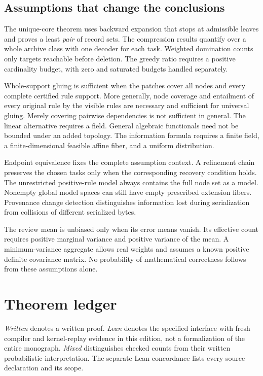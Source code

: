 \documentclass[11pt,oneside]{article}
\theoremstyle{komorebiplain}
\theoremstyle{komorebidefinition}
\theoremstyle{komorebiremark}
\begin{document}
\subsection*{Assumptions that change the conclusions}
The unique-core theorem uses backward expansion that stops at admissible leaves and proves a least \emph{pair} of record sets. The compression results quantify over a whole archive class with one decoder for each task. Weighted domination counts only targets reachable before deletion. The greedy ratio requires a positive cardinality budget, with zero and saturated budgets handled separately.

Whole-support gluing is sufficient when the patches cover all nodes and every complete certified rule support. More generally, node coverage and entailment of every original rule by the visible rules are necessary and sufficient for universal gluing. Merely covering pairwise dependencies is not sufficient in general. The linear alternative requires a field. General algebraic functionals need not be bounded under an added topology. The information formula requires a finite field, a finite-dimensional feasible affine fiber, and a uniform distribution.

Endpoint equivalence fixes the complete assumption context. A refinement chain preserves the chosen tasks only when the corresponding recovery condition holds. The unrestricted positive-rule model always contains the full node set as a model. Nonempty global model spaces can still have empty prescribed extension fibers. Provenance change detection distinguishes information lost during serialization from collisions of different serialized bytes.

The review mean is unbiased only when its error means vanish. Its effective count requires positive marginal variance and positive variance of the mean. A minimum-variance aggregate allows real weights and assumes a known positive definite covariance matrix. No probability of mathematical correctness follows from these assumptions alone.



\clearpage
\section{Theorem ledger}
\label{app:ledger}

\emph{Written} denotes a written proof. \emph{Lean} denotes the specified interface with fresh compiler and kernel-replay evidence in this edition, not a formalization of the entire monograph. \emph{Mixed} distinguishes checked counts from their written probabilistic interpretation. The separate Lean concordance lists every source declaration and its scope.
\end{document}
